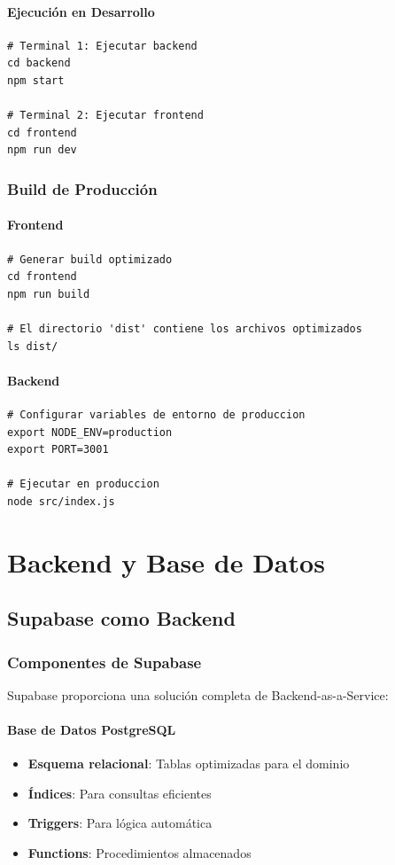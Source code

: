 \documentclass[12pt,a4paper]{report}
\begin{document}
\subsubsection{Ejecución en Desarrollo}
\begin{lstlisting}
# Terminal 1: Ejecutar backend
cd backend
npm start

# Terminal 2: Ejecutar frontend
cd frontend
npm run dev
\end{lstlisting}

\subsection{Build de Producción}

\subsubsection{Frontend}
\begin{lstlisting}
# Generar build optimizado
cd frontend
npm run build

# El directorio 'dist' contiene los archivos optimizados
ls dist/
\end{lstlisting}

\subsubsection{Backend}
\begin{lstlisting}
# Configurar variables de entorno de produccion
export NODE_ENV=production
export PORT=3001

# Ejecutar en produccion
node src/index.js
\end{lstlisting}

\chapter{Backend y Base de Datos}

\section{Supabase como Backend}

\subsection{Componentes de Supabase}

Supabase proporciona una solución completa de Backend-as-a-Service:

\subsubsection{Base de Datos PostgreSQL}
\begin{itemize}
    \item \textbf{Esquema relacional}: Tablas optimizadas para el dominio
    \item \textbf{Índices}: Para consultas eficientes
    \item \textbf{Triggers}: Para lógica automática
    \item \textbf{Functions}: Procedimientos almacenados
\end{itemize}
\end{document}
